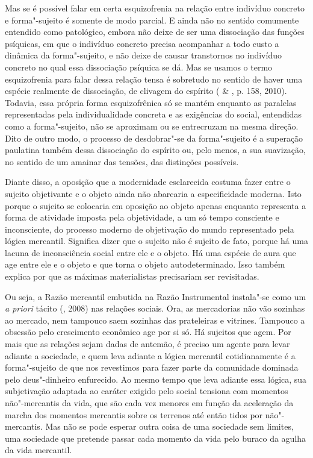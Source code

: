 Mas se é possível falar em certa esquizofrenia na relação entre
indivíduo concreto e forma"-sujeito é somente de modo parcial. E ainda
não no sentido comumente entendido como patológico, embora não deixe de
ser uma dissociação das funções psíquicas, em que o indivíduo concreto
precisa acompanhar a todo custo a dinâmica da forma"-sujeito, e não deixe
de causar transtornos no indivíduo concreto no qual essa dissociação
psíquica se dá. Mas se usamos o termo esquizofrenia para falar dessa
relação tensa é sobretudo no sentido de haver uma espécie realmente de
dissociação, de clivagem do espírito ( \& , p. 158,
2010). Todavia, essa própria forma esquizofrênica só se mantém enquanto
as paralelas representadas pela individualidade concreta e as exigências
do social, entendidas como a forma"-sujeito, não se aproximam ou se
entrecruzam na mesma direção. Dito de outro modo, o processo de
desdobrar"-se da forma"-sujeito é a superação paulatina também dessa
dissociação do espírito ou, pelo menos, a sua suavização, no sentido de
um amainar das tensões, das distinções possíveis.

Diante disso, a oposição que a modernidade esclarecida costuma fazer
entre o sujeito objetivante e o objeto ainda não abarcaria a
especificidade moderna. Isto porque o sujeito se colocaria em oposição
ao objeto apenas enquanto representa a forma de atividade imposta pela
objetividade, a um só tempo consciente e inconsciente, do processo
moderno de objetivação do mundo representado pela lógica mercantil.
Significa dizer que o sujeito não é sujeito de fato, porque há uma
lacuna de inconsciência social entre ele e o objeto. Há uma espécie de
aura que age entre ele e o objeto e que torna o objeto autodeterminado.
Isso também explica por que as máximas materialistas precisariam ser
revisitadas.

Ou seja, a Razão mercantil embutida na Razão Instrumental instala"-se
como um \emph{a priori} tácito (, 2008) nas relações sociais. Ora,
as mercadorias não vão sozinhas ao mercado, nem tampouco saem sozinhas
das prateleiras e vitrines. Tampouco a obsessão pelo crescimento
econômico age por si só. Há sujeitos que agem. Por mais que as relações
sejam dadas de antemão, é preciso um agente para levar adiante a
sociedade, e quem leva adiante a lógica mercantil cotidianamente é a
forma"-sujeito de que nos revestimos para fazer parte da comunidade dominada
pelo deus"-dinheiro enfurecido. Ao mesmo tempo que leva adiante essa lógica, sua
subjetivação adaptada ao caráter exigido pelo social tensiona com
momentos não"-mercantis da vida, que são cada vez menores em função da
aceleração da marcha dos momentos mercantis sobre os terrenos até então
tidos por não"-mercantis. Mas não se pode esperar outra coisa de uma
sociedade sem limites, uma sociedade que pretende passar cada momento da
vida pelo buraco da agulha da vida mercantil.

